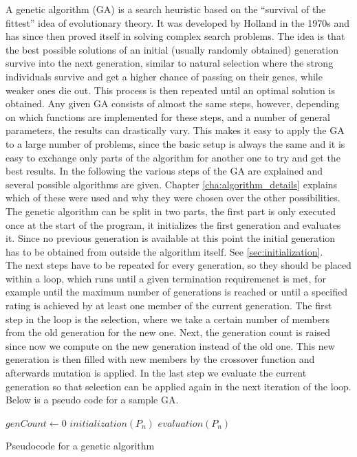 A genetic algorithm (GA) is a search heuristic based on the "`survival of the fittest"' idea of evolutionary theory. It was developed by Holland in the 1970s \cite{15} and has since then proved itself in solving complex search problems. The idea is that the best possible solutions of an initial (usually randomly obtained) generation survive into the next generation, similar to natural selection where the strong individuals survive and get a higher chance of passing on their genes, while weaker ones die out. This process is then repeated until an optimal solution is obtained. Any given GA consists of almost the same steps, however, depending on which functions are implemented for these steps, and a number of general parameters, the results can drastically vary. This makes it easy to apply the GA to a large number of problems, since the basic setup is always the same and it is easy to exchange only parts of the algorithm for another one to try and get the best results. In the following the various steps of the GA are explained and several possible algorithms are given. Chapter \ref{cha:algorithm_details} explains which of these were used and why they were chosen over the other possibilities. \\
The genetic algorithm can be split in two parts, the first part is only executed once at the start of the program, it initializes the first generation and evaluates it. Since no previous generation is available at this point the initial generation has to be obtained from outside the algorithm itself. See \ref{sec:initialization}. \\
The next steps have to be repeated for every generation, so they should be placed within a loop, which runs until a given termination requiremenet is met, for example until the maximum number of generations is reached or until a specified rating is achieved by at least one member of the current generation. The first step in the loop is the selection, where we take a certain number of members from the old generation for the new one. Next, the generation count is raised since now we compute on the new generation instead of the old one. This new generation is then filled with new members by the crossover function and afterwards mutation is applied. In the last step we evaluate the current generation so that selection can be applied again in the next iteration of the loop.
Below is a pseudo code for a sample GA.\\
\vspace{1cm}
\begin{algorithm}[H]
	\SetAlgoLined
	$genCount\leftarrow0$\;
	$initialization(P_n)$\;
	$evaluation(P_n)$\;
	\caption{Pseudocode for a genetic algorithm}
\end{algorithm}
		

